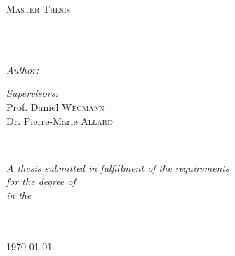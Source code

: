 \documentclass[
11pt, %
oneside, %
english, %
singlespacing, %
headsepline, %
chapterinoneline, %
]{MastersDoctoralThesis} %
\author{Marco \textsc{Visani}} %
\begin{document}
\frontmatter %

\pagestyle{plain} %


\begin{titlepage}
\begin{center}

\vspace*{.06\textheight}
{\scshape\LARGE \univname\par}\vspace{1.5cm} %
\textsc{\Large Master Thesis}\\[0.5cm] %

\HRule \\[0.4cm] %
{\huge \bfseries \ttitle\par}\vspace{0.4cm} %
\HRule \\[1.5cm] %
 
\begin{minipage}[t]{0.4\textwidth}
\begin{flushleft} \large
\emph{Author:}\\
\href{mailto:contact@vismarco.ch}{\authorname} %
\end{flushleft}
\end{minipage}
\begin{minipage}[t]{0.4\textwidth}
\begin{flushright} \large
\emph{Supervisors:} \\
\href{mailto:daniel.wegmann@unifr.ch}{Prof. Daniel \textsc{Wegmann}} \\
\href{mailto:pierre-marie.allard@unifr.ch}{Dr. Pierre-Marie \textsc{Allard}}%
\end{flushright}
\end{minipage}\\[3cm]
 
\vfill

\large \textit{A thesis submitted in fulfillment of the requirements \\ for the degree of \degreename}\\[0.3cm] %
\textit{in the}\\[0.4cm]
\groupname\\\deptname\\[2cm] %
 
\vfill

{\large \today}\\[4cm] %
 
\vfill
\end{center}
\end{titlepage}
\end{document}
